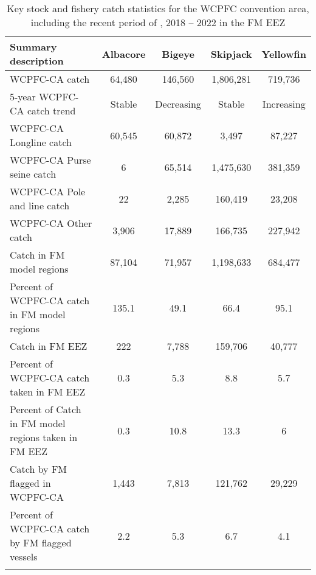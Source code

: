 \begin{longtable}{lcccc}
\caption{Key stock and fishery catch statistics for the WCPFC convention area, including the recent period of , 2018 -- 2022 in the FM EEZ} \\ 
  \hline
Summary description & Albacore & Bigeye & Skipjack & Yellowfin \\ 
  \hline
WCPFC-CA catch & 64,480 & 146,560 & 1,806,281 & 719,736 \\ 
  5-year WCPFC-CA catch trend & Stable & Decreasing & Stable & Increasing \\ 
  WCPFC-CA Longline catch & 60,545 & 60,872 & 3,497 & 87,227 \\ 
  WCPFC-CA Purse seine catch & 6 & 65,514 & 1,475,630 & 381,359 \\ 
  WCPFC-CA Pole and line catch & 22 & 2,285 & 160,419 & 23,208 \\ 
  WCPFC-CA Other catch & 3,906 & 17,889 & 166,735 & 227,942 \\ 
  Catch in FM model regions & 87,104 & 71,957 & 1,198,633 & 684,477 \\ 
  Percent of WCPFC-CA catch in FM model regions & 135.1 & 49.1 & 66.4 & 95.1 \\ 
   \hline
Catch in FM EEZ & 222 & 7,788 & 159,706 & 40,777 \\ 
  Percent of WCPFC-CA catch taken in FM EEZ & 0.3 & 5.3 & 8.8 & 5.7 \\ 
  Percent of Catch in FM model regions taken in FM EEZ & 0.3 & 10.8 & 13.3 & 6 \\ 
  Catch by FM flagged in WCPFC-CA & 1,443 & 7,813 & 121,762 & 29,229 \\ 
  Percent of WCPFC-CA catch by FM flagged vessels & 2.2 & 5.3 & 6.7 & 4.1 \\ 
  \hline
\label{cat_sum_tab}
\end{longtable}
